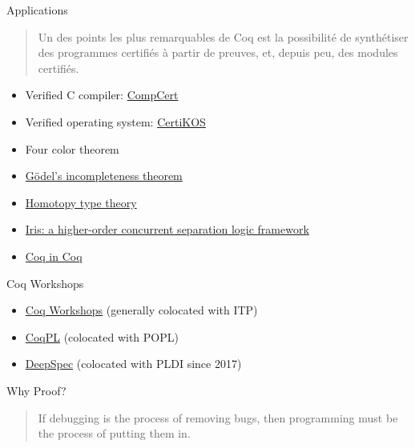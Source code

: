 \documentclass[usenames,xcolor=svgnames,11pt,sans,aspectratio=169,handout]{beamer}
\begin{document}
\begin{frame}{Applications}
  \begin{quote}
    Un des points les plus remarquables de Coq est la possibilité de synthétiser des programmes certifiés à partir de preuves,
    et, depuis peu, des modules certifiés.

  \end{quote}
  \begin{itemize}
    \item<1-> Verified C compiler: \href{http://compcert.inria.fr}{CompCert}
    \item<2-> Verified operating system: \href{http://flint.cs.yale.edu/certikos/index.html}{CertiKOS}
    \item<3-> Four color theorem
    \item<4-> \href{http://r6.ca/Goedel/goedel1.html}{Gödel's incompleteness theorem}
    \item<5-> \href{https://github.com/HoTT/HoTT/}{Homotopy type theory}
    \item<6-> \href{https://iris-project.org}{Iris: a higher-order concurrent separation logic framework}
    \item<7-> \href{https://github.com/coq-contribs/coq-in-coq}{Coq in Coq}
  \end{itemize}
\end{frame}

\begin{frame}{Coq Workshops}
  \begin{itemize}
    \item \href{https://coq-workshop.gitlab.io}{Coq Workshops} (generally colocated with ITP)
    \item \href{https://coq.inria.fr/coqpl.html}{CoqPL} (colocated with POPL)
    \item \href{https://deepspec.org/page/Event/}{DeepSpec} (colocated with PLDI since 2017)
  \end{itemize}
\end{frame}

\begin{frame}{Why Proof?}
  \linespread{1.5}
  \begin{quote}
    If debugging is the process of removing bugs, then programming must be the process of putting them in.

  \end{quote}
\end{frame}
\end{document}

